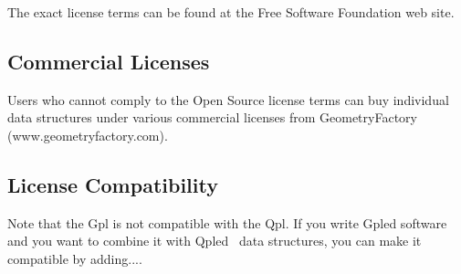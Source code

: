 The exact license terms can be found at the Free Software Foundation web site.

\subsection{Commercial Licenses \label{licenses:Commercial}}

Users who cannot comply to the Open Source license terms can buy individual
data structures under various commercial licenses from GeometryFactory (www.geometryfactory.com).


\subsection{License Compatibility \label{licenses:Compatibility}}

Note that the {\sc Gpl} is not compatible with the {\sc Qpl}. If you write
{\sc Gpl}ed software and you want to combine it with {\sc Qpl}ed \cgal\ data
structures, you can make it compatible by adding....
